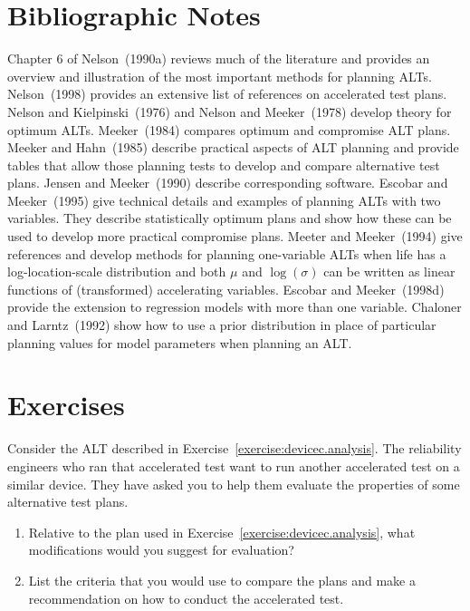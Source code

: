 \section*{Bibliographic Notes}
Chapter 6 of Nelson~(1990a) reviews much of the literature and
provides an overview and illustration of the most important methods
for planning ALTs.  Nelson~(1998) provides an extensive list of
references on accelerated test plans. Nelson and Kielpinski~(1976)
and Nelson and Meeker~(1978) develop theory for optimum ALTs.
Meeker~(1984) compares optimum and compromise ALT plans.  Meeker and
Hahn~(1985) describe practical aspects of ALT planning and provide
tables that allow those planning tests to develop and compare
alternative test plans.  Jensen and Meeker~(1990) describe
corresponding software.  Escobar and Meeker~(1995) give technical
details and examples of planning ALTs with two variables. They
describe statistically optimum plans and show how these can be used
to develop more practical compromise plans.  Meeter and
Meeker~(1994) give references and develop methods for planning
one-variable ALTs when life has a log-location-scale distribution
and both $\mu$ and $\log(\sigma)$ can be written as linear functions
of (transformed) accelerating variables.  Escobar and Meeker~(1998d)
provide the extension to regression models with more than one
variable.  Chaloner and Larntz~(1992) show how to use a prior
distribution in place of particular planning values for model
parameters when planning an ALT.

\section*{Exercises}

\begin{exercise}
Consider the ALT described in
Exercise~\ref{exercise:devicec.analysis}.  The reliability engineers
who ran that accelerated test want to run another accelerated test
on a similar device. They have asked you to help them evaluate the
properties of some alternative test plans.
\begin{enumerate}
\item
Relative to the plan used in Exercise~\ref{exercise:devicec.analysis},
what modifications would you suggest for evaluation?
\item
List the criteria that you would use to compare the plans and make a
recommendation on how to conduct the accelerated test.
\end{enumerate}
\end{exercise}

